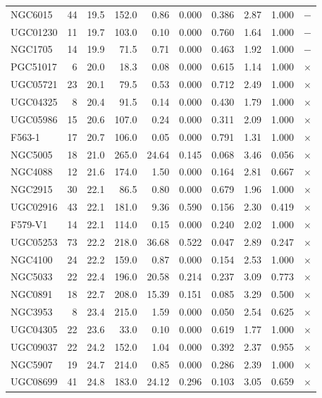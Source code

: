 \begin{longtable}{lrrrrrrrrr}
NGC6015 & 44 & 19.5 & 152.0 & 0.86 & 0.000 & 0.386 & 2.87 & 1.000 & $-$ \\
UGC01230 & 11 & 19.7 & 103.0 & 0.10 & 0.000 & 0.760 & 1.64 & 1.000 & $-$ \\
NGC1705 & 14 & 19.9 & 71.5 & 0.71 & 0.000 & 0.463 & 1.92 & 1.000 & $-$ \\
\midrule
PGC51017 & 6 & 20.0 & 18.3 & 0.08 & 0.000 & 0.615 & 1.14 & 1.000 & $\times$ \\
UGC05721 & 23 & 20.1 & 79.5 & 0.53 & 0.000 & 0.712 & 2.49 & 1.000 & $\times$ \\
UGC04325 & 8 & 20.4 & 91.5 & 0.14 & 0.000 & 0.430 & 1.79 & 1.000 & $\times$ \\
UGC05986 & 15 & 20.6 & 107.0 & 0.24 & 0.000 & 0.311 & 2.09 & 1.000 & $\times$ \\
F563-1 & 17 & 20.7 & 106.0 & 0.05 & 0.000 & 0.791 & 1.31 & 1.000 & $\times$ \\
NGC5005 & 18 & 21.0 & 265.0 & 24.64 & 0.145 & 0.068 & 3.46 & 0.056 & $\times$ \\
NGC4088 & 12 & 21.6 & 174.0 & 1.50 & 0.000 & 0.164 & 2.81 & 0.667 & $\times$ \\
NGC2915 & 30 & 22.1 & 86.5 & 0.80 & 0.000 & 0.679 & 1.96 & 1.000 & $\times$ \\
UGC02916 & 43 & 22.1 & 181.0 & 9.36 & 0.590 & 0.156 & 2.30 & 0.419 & $\times$ \\
F579-V1 & 14 & 22.1 & 114.0 & 0.15 & 0.000 & 0.240 & 2.02 & 1.000 & $\times$ \\
UGC05253 & 73 & 22.2 & 218.0 & 36.68 & 0.522 & 0.047 & 2.89 & 0.247 & $\times$ \\
NGC4100 & 24 & 22.2 & 159.0 & 0.87 & 0.000 & 0.154 & 2.53 & 1.000 & $\times$ \\
NGC5033 & 22 & 22.4 & 196.0 & 20.58 & 0.214 & 0.237 & 3.09 & 0.773 & $\times$ \\
NGC0891 & 18 & 22.7 & 208.0 & 15.39 & 0.151 & 0.085 & 3.29 & 0.500 & $\times$ \\
NGC3953 & 8 & 23.4 & 215.0 & 1.59 & 0.000 & 0.050 & 2.54 & 0.625 & $\times$ \\
UGC04305 & 22 & 23.6 & 33.0 & 0.10 & 0.000 & 0.619 & 1.77 & 1.000 & $\times$ \\
UGC09037 & 22 & 24.2 & 152.0 & 1.04 & 0.000 & 0.392 & 2.37 & 0.955 & $\times$ \\
NGC5907 & 19 & 24.7 & 214.0 & 0.85 & 0.000 & 0.286 & 2.39 & 1.000 & $\times$ \\
UGC08699 & 41 & 24.8 & 183.0 & 24.12 & 0.296 & 0.103 & 3.05 & 0.659 & $\times$ \\

\end{longtable}
